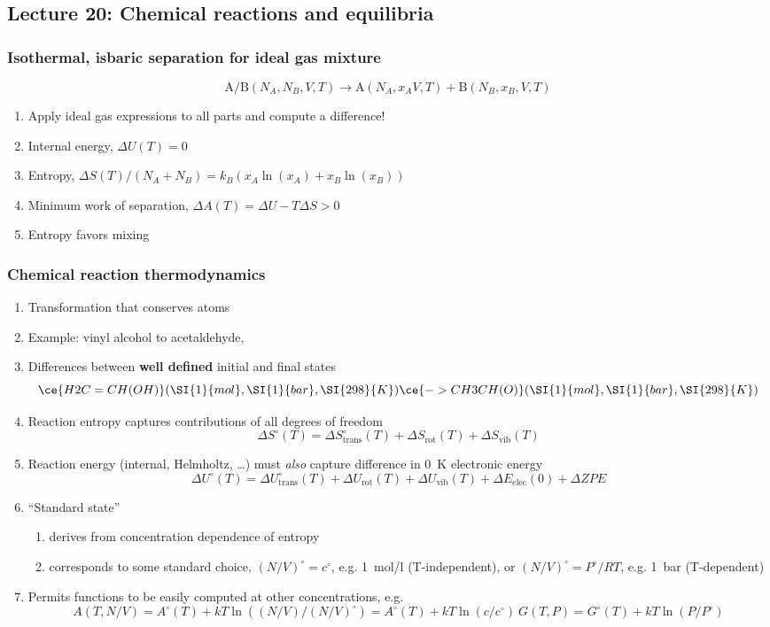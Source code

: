\documentclass[11pt]{article}
\begin{document}
\subsection{Lecture 20: Chemical reactions and equilibria}
\label{sec:org8697509}
\subsubsection{Isothermal, isbaric separation for ideal gas mixture}
\label{sec:org586786f}
\[ \text{A/B} (N_{A},N_{B},V,T) \rightarrow \text{A}(N_{A},x_{A}V,T) + \text{B}(N_{B},x_{B},V,T) \]
\begin{enumerate}
\item Apply ideal gas expressions to all parts and compute a difference!
\item Internal energy, \(\Delta U(T) = 0\)
\item Entropy, \(\Delta S(T)/(N_A+N_B) = k_B(x_A\ln(x_A) + x_B \ln(x_B))\)
\item Minimum work of separation, \(\Delta A(T) = \Delta U - T\Delta S > 0\)
\item Entropy favors mixing
\end{enumerate}
\subsubsection{Chemical reaction thermodynamics}
\label{sec:org830ab00}
\begin{enumerate}
\item Transformation that conserves atoms
\item Example: vinyl alcohol to acetaldehyde, 
\item Differences between \textbf{well defined} initial and final states
\[ \ce{H2C=CH(OH)} (\SI{1}{mol},\SI{1}{bar},\SI{298}{K}) \ce{-> CH3CH(O)} (\SI{1}{mol},\SI{1}{bar},\SI{298}{K})  \]
\item Reaction entropy captures contributions of all degrees of freedom
\[\Delta S^\circ(T) = \Delta S^\circ_\text{trans}(T)+ \Delta S_\text{rot}(T) +\Delta S_\text{vib}(T)\]
\item Reaction energy (internal, Helmholtz, \ldots{}) must \emph{also} capture difference
in \SI{0}{K} electronic energy
 \[\Delta U^\circ(T) = \Delta U^\circ_\text{trans}(T)+ \Delta U_\text{rot}(T) +\Delta U_\text{vib}(T) + \Delta E_\text{elec}(0) + \Delta ZPE\]
\item ``Standard state''
\begin{enumerate}
\item derives from concentration dependence of entropy
\item corresponds to some standard choice, \((N/V)^\circ = c^\circ\), e.g. \SI{1}{mol/l} (T-independent), or \((N/V)^\circ = P^\circ/RT\), e.g. \SI{1}{bar} (T-dependent)
\end{enumerate}
\item Permits functions to be easily computed at other concentrations, e.g.
\begin{displaymath}
A(T,N/V)  = A^\circ(T) + k T \ln\left ( (N/V)/(N/V)^\circ \right ) =A^\circ(T) + k T \ln \left ( c/c^\circ \right ) \
G(T,P)  = G^\circ(T) + k T \ln\left ( P/P^\circ \right )
\end{displaymath}
\end{enumerate}
\end{document}
